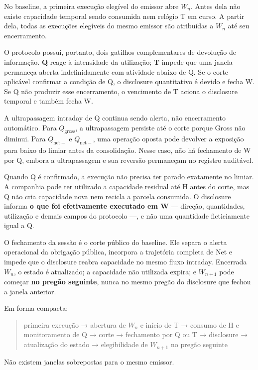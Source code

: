 \documentclass[
  a4paper,
]{article}
\begin{document}
No baseline, a primeira execução elegível do emissor abre \(W_n\). Antes
dela não existe capacidade temporal sendo consumida nem relógio T em
curso. A partir dela, todas as execuções elegíveis do mesmo emissor são
atribuídas a \(W_n\) até seu encerramento.

O protocolo possui, portanto, dois gatilhos complementares de devolução
de informação. \textbf{Q} reage à intensidade da utilização; \textbf{T}
impede que uma janela permaneça aberta indefinidamente com atividade
abaixo de Q. Se o corte aplicável confirmar a condição de Q, o
disclosure quantitativo é devido e fecha W. Se Q não produzir esse
encerramento, o vencimento de T aciona o disclosure temporal e também
fecha W.

A ultrapassagem intraday de Q continua sendo alerta, não encerramento
automático. Para \(Q_{\mathrm{gross}}\), a ultrapassagem persiste até o
corte porque Gross não diminui. Para \(Q_{\mathrm{net}+}\) e
\(Q_{\mathrm{net}-}\), uma operação oposta pode devolver a exposição
para baixo do limiar antes da consolidação. Nesse caso, não há
fechamento de W por Q, embora a ultrapassagem e sua reversão permaneçam
no registro auditável.

Quando Q é confirmado, a execução não precisa ter parado exatamente no
limiar. A companhia pode ter utilizado a capacidade residual até H antes
do corte, mas Q não cria capacidade nova nem recicla a parcela
consumida. O disclosure informa \textbf{o que foi efetivamente executado
em W} --- direção, quantidades, utilização e demais campos do protocolo
---, e não uma quantidade ficticiamente igual a Q.

O fechamento da sessão é o corte público do baseline. Ele separa o
alerta operacional da obrigação pública, incorpora a trajetória completa
de Net e impede que o disclosure reabra capacidade no mesmo fluxo
intraday. Encerrada \(W_n\), o estado é atualizado; a capacidade não
utilizada expira; e \(W_{n+1}\) pode começar \textbf{no pregão
seguinte}, nunca no mesmo pregão do disclosure que fechou a janela
anterior.

Em forma compacta:

\begin{quote}
primeira execução → abertura de \(W_n\) e início de T → consumo de H e
monitoramento de Q → corte → fechamento por Q ou T → disclosure →
atualização do estado → elegibilidade de \(W_{n+1}\) no pregão seguinte
\end{quote}

Não existem janelas sobrepostas para o mesmo emissor.
\end{document}
